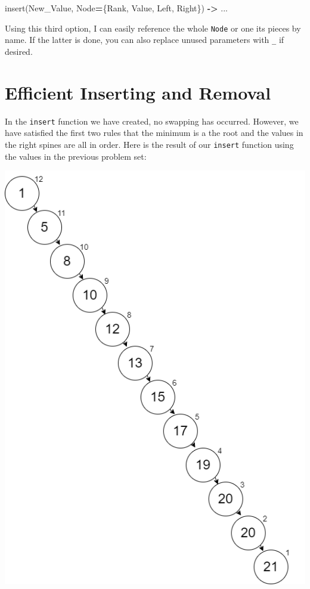 \documentclass[
]{book}
\newenvironment{Shaded}{\begin{snugshade}}{\end{snugshade}}
\newcommand{\FunctionTok}[1]{\textcolor[rgb]{0.00,0.00,0.00}{#1}}
\newcommand{\OperatorTok}[1]{\textcolor[rgb]{0.81,0.36,0.00}{\textbf{#1}}}
\newcommand{\VariableTok}[1]{\textcolor[rgb]{0.00,0.00,0.00}{#1}}
\begin{document}
\begin{problembox}
\begin{Shaded}
\begin{Highlighting}[]
\FunctionTok{insert(}\VariableTok{New\_Value}\FunctionTok{,} \VariableTok{Node}\OperatorTok{=}\FunctionTok{\{}\VariableTok{Rank}\FunctionTok{,} \VariableTok{Value}\FunctionTok{,} \VariableTok{Left}\FunctionTok{,} \VariableTok{Right}\FunctionTok{\})} \OperatorTok{{-}\textgreater{}} \FunctionTok{...}
\end{Highlighting}
\end{Shaded}

Using this third option, I can easily reference the whole \texttt{Node} or one its pieces by name. If the latter is done, you can also replace unused parameters with \texttt{\_} if desired.

\end{problembox}

\hypertarget{efficient-inserting-and-removal}{%
\section{Efficient Inserting and Removal}\label{efficient-inserting-and-removal}}

In the \texttt{insert} function we have created, no swapping has occurred. However, we have satisfied the first two rules that the minimum is a the root and the values in the right spines are all in order. Here is the result of our \texttt{insert} function using the values in the previous problem set:

\includegraphics{images/heap_bad.drawio.png}
\end{document}
